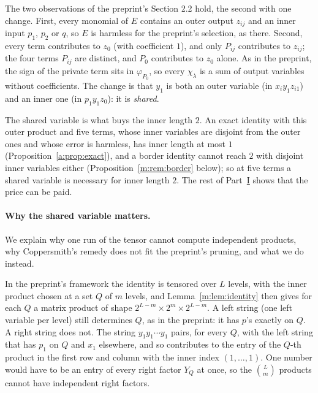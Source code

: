 \documentclass[11pt]{article}
\theoremstyle{definition}
\theoremstyle{remark}
\begin{document}
The two observations of the preprint's Section 2.2 hold, the second with one change. First, every monomial of $E$ contains an outer output $z_{ij}$ and an inner input $p_1$, $p_2$ or $q$, so $E$ is harmless for the preprint's selection, as there. Second, every term contributes to $z_0$ (with coefficient $1$), and only $P_{ij}$ contributes to $z_{ij}$; the four terms $P_{ij}$ are distinct, and $P_0$ contributes to $z_0$ alone. As in the preprint, the sign of the private term sits in $\varphi_{P_0}$, so every $\chi_\lambda$ is a sum of output variables without coefficients. The change is that $y_1$ is both an outer variable (in $x_iy_1z_{i1}$) and an inner one (in $p_1y_1z_0$): it is \emph{shared}.

The shared variable is what buys the inner length $2$. An exact identity with this outer product and five terms, whose inner variables are disjoint from the outer ones and whose error is harmless, has inner length at most $1$ (Proposition~\ref{a:prop:exact}), and a border identity cannot reach $2$ with disjoint inner variables either (Proposition~\ref{m:rem:border} below); so at five terms a shared variable is necessary for inner length $2$. The rest of Part~\hyperref[m:partI]{I} shows that the price can be paid.

\paragraph{Why the shared variable matters.} We explain why one run of the tensor cannot compute independent products, why Coppersmith's remedy does not fit the preprint's pruning, and what we do instead.

In the preprint's framework the identity is tensored over $L$ levels, with the inner product chosen at a set $Q$ of $m$ levels, and Lemma~\ref{m:lem:identity} then gives for each $Q$ a matrix product of shape $2^{L-m}\times2^m\times2^{L-m}$. A left string (one left variable per level) still determines $Q$, as in the preprint: it has $p$'s exactly on $Q$. A right string does not. The string $y_1y_1\cdots y_1$ pairs, for every $Q$, with the left string that has $p_1$ on $Q$ and $x_1$ elsewhere, and so contributes to the entry of the $Q$-th product in the first row and column with the inner index $(1,\dots,1)$. One number would have to be an entry of every right factor $Y_Q$ at once, so the $\binom Lm$ products cannot have independent right factors.
\end{document}
